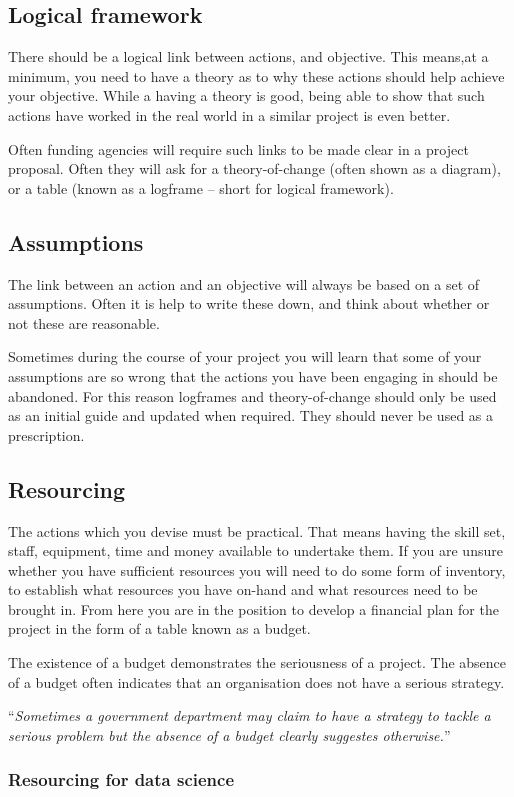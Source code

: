 \documentclass{article}
\begin{document}
\subsection*{Logical framework}
There should be a logical link between actions, and objective. This means,at a minimum, you need to have a theory as to why these actions should help achieve your objective. While a having a theory is good, being able to show that such actions have worked in the real world in a similar project is even better.

Often funding agencies will require such links to be made clear in a project proposal. Often they will ask for a theory-of-change (often shown as a diagram), or a table (known as a logframe -- short for logical framework).

\subsection*{Assumptions}
The link between an action and an objective will always be based on a set of assumptions. Often it is help to write these down, and think about whether or not these are reasonable.

Sometimes during the course of your project you will learn that some of your assumptions are so wrong that the actions you have been engaging in should be abandoned. For this reason logframes and theory-of-change should only be used as an initial guide and updated when required. They should never be used as a prescription.

\subsection*{Resourcing}
The actions which you devise must be practical. That means having the skill set, staff, equipment, time and money available to undertake them. If you are unsure whether you have sufficient resources you will need to do some form of inventory, to establish what resources you have on-hand and what resources need to be brought in. From here you are in the position to develop a financial plan for the project in the form of a table known as a budget.

The existence of a budget demonstrates the seriousness of a project. The absence of a budget often indicates that an organisation does not have a serious strategy. 

\vspace{3mm}
``\emph{Sometimes a government department may claim to have a strategy to tackle a serious problem but the absence of a budget clearly suggestes otherwise.}''
\vspace{3mm}

\subsubsection*{Resourcing for data science}
\end{document}
